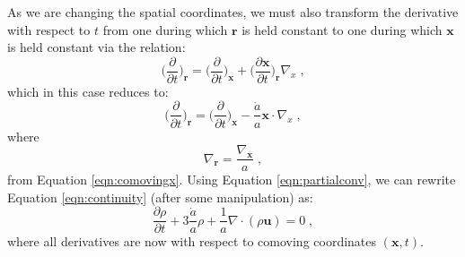 \documentclass{aastex}
\newcommand{\optionrule}{\noindent\rule{1.0\textwidth}{0.75pt}}
\newenvironment{aside}{%
  \def\FrameCommand{\hspace{2em}}
  \MakeFramed {\advance\hsize-\width \small}\optionrule}
{\newline\optionrule\endMakeFramed}
\begin{document}
As we are changing the spatial coordinates, we must also transform 
the derivative with respect to $t$ from
one during which $\mathbf{r}$ is held constant to one during which
$\mathbf{x}$ is held constant via the relation:
\begin{equation}
  \bigg(\frac{\partial}{\partial t} \bigg)_{\mathbf{r}} =
  \bigg(\frac{\partial}{\partial t} \bigg)_{\mathbf{x}} +\bigg(
  \frac{ \partial \mathbf{x} }{ \partial t} \bigg)_{\mathbf{r}}
  \nabla_x \;,
\end{equation}
which in this case reduces to:
\begin{equation}\label{eqn:partialconv}
  \bigg(\frac{\partial}{\partial t}\bigg)_{\mathbf{r}} = \bigg(\frac{\partial}{\partial
  t}\bigg)_{\mathbf{x}} - \frac{\dot{a} }{a} \mathbf{x}\cdot\nabla_x \;,
\end{equation}
where
\begin{equation}
  \nabla_{\mathbf{r}}=\frac{ \nabla_{\mathbf{x}}}{a} \;,
\end{equation}
from Equation \eqref{eqn:comovingx}.
Using Equation \eqref{eqn:partialconv}, we can rewrite Equation
\eqref{eqn:continuity} (after some manipulation) as:
\begin{equation}\label{eqn:continuity2}
  \frac{ \partial \rho }{ \partial t } + 3 \frac{\dot{a}}{a} \rho +
  \frac{1}{a} \nabla \cdot ( \rho \mathbf{u} ) = 0 \;,
\end{equation}
where all derivatives are now with respect to comoving coordinates $(\mathbf{x},t)$.

\end{document}

